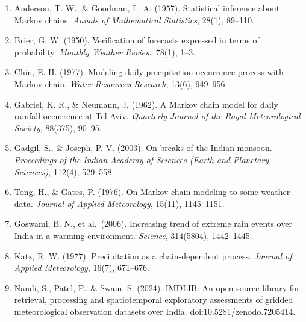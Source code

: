 \documentclass[11pt,a4paper]{article}
\providecommand{\tightlist}{\setlength{\itemsep}{0pt}\setlength{\parskip}{0pt}}
\begin{document}
\begin{enumerate}

\def\labelenumi{\arabic{enumi}.}

\tightlist

\item

  Anderson, T. W., \& Goodman, L. A. (1957). Statistical inference about Markov chains. \emph{Annals of Mathematical Statistics}, 28(1), 89--110.

\item

  Brier, G. W. (1950). Verification of forecasts expressed in terms of probability. \emph{Monthly Weather Review}, 78(1), 1--3.

\item

  Chin, E. H. (1977). Modeling daily precipitation occurrence process with Markov chain. \emph{Water Resources Research}, 13(6), 949--956.

\item

  Gabriel, K. R., \& Neumann, J. (1962). A Markov chain model for daily rainfall occurrence at Tel Aviv. \emph{Quarterly Journal of the Royal Meteorological Society}, 88(375), 90--95.

\item

  Gadgil, S., \& Joseph, P. V. (2003). On breaks of the Indian monsoon. \emph{Proceedings of the Indian Academy of Sciences (Earth and Planetary Sciences)}, 112(4), 529--558.

\item

  Tong, H., \& Gates, P. (1976). On Markov chain modeling to some weather data. \emph{Journal of Applied Meteorology}, 15(11), 1145--1151.

\item

  Goswami, B. N., et al.~(2006). Increasing trend of extreme rain events over India in a warming environment. \emph{Science}, 314(5804), 1442--1445.

\item

  Katz, R. W. (1977). Precipitation as a chain-dependent process. \emph{Journal of Applied Meteorology}, 16(7), 671--676.

\item

  Nandi, S., Patel, P., \& Swain, S. (2024). IMDLIB: An open-source library for retrieval, processing and spatiotemporal exploratory assessments of gridded meteorological observation datasets over India. doi:10.5281/zenodo.7205414.


\end{enumerate}
\end{document}
